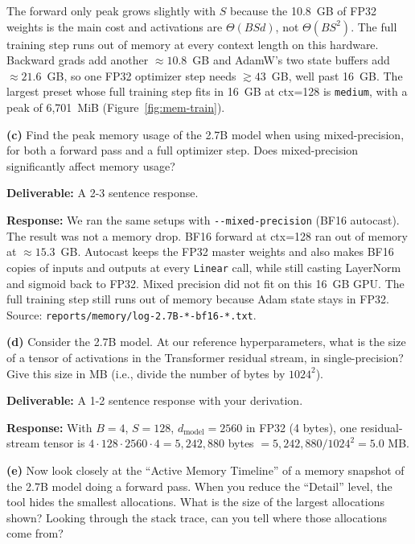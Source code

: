 \documentclass[11pt]{article}
\begin{document}
\noindent The forward only peak grows slightly with $S$ because the 10.8~GB of FP32 weights is the main cost and activations are $\Theta(BSd)$, not $\Theta(BS^2)$. The full training step runs out of memory at every context length on this hardware. Backward grads add another $\approx 10.8$~GB and AdamW's two state buffers add $\approx 21.6$~GB, so one FP32 optimizer step needs $\gtrsim 43$~GB, well past 16~GB. The largest preset whose full training step fits in 16~GB at ctx=128 is \texttt{medium}, with a peak of 6{,}701~MiB (Figure~\ref{fig:mem-train}).

\textbf{(c)} Find the peak memory usage of the 2.7B model when using mixed-precision, for both a forward pass and a full optimizer step. Does mixed-precision significantly affect memory usage?

\textbf{Deliverable:} A 2-3 sentence response.

\vspace{0.25cm}
\textbf{Response:}
We ran the same setups with \verb|--mixed-precision| (BF16 autocast). The result was not a memory drop. BF16 forward at ctx=128 ran out of memory at $\approx 15.3$~GB. Autocast keeps the FP32 master weights and also makes BF16 copies of inputs and outputs at every \texttt{Linear} call, while still casting LayerNorm and sigmoid back to FP32. Mixed precision did not fit on this 16~GB GPU. The full training step still runs out of memory because Adam state stays in FP32. Source: \verb|reports/memory/log-2.7B-*-bf16-*.txt|.

\textbf{(d)} Consider the 2.7B model. At our reference hyperparameters, what is the size of a tensor of activations in the Transformer residual stream, in single-precision? Give this size in MB (i.e., divide the number of bytes by $1024^2$).

\textbf{Deliverable:} A 1-2 sentence response with your derivation.

\vspace{0.25cm}
\textbf{Response:}
With $B=4$, $S=128$, $d_\text{model}=2560$ in FP32 (4 bytes), one residual-stream tensor is $4 \cdot 128 \cdot 2560 \cdot 4 = 5{,}242{,}880$ bytes $= 5{,}242{,}880 / 1024^2 = 5.0$ MB.

\textbf{(e)} Now look closely at the ``Active Memory Timeline'' of a memory snapshot of the 2.7B model doing a forward pass. When you reduce the ``Detail'' level, the tool hides the smallest allocations. What is the size of the largest allocations shown? Looking through the stack trace, can you tell where those allocations come from?
\end{document}
